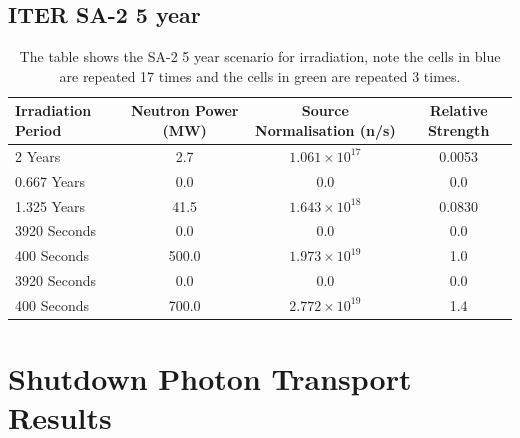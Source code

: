 \documentclass[12pt]{article}
\begin{document}
\subsection{ITER SA-2 5 year}
\begin{table}[ht!]
   \begin{tabular}{| l | c | c | c |}
      \hline 
      Irradiation Period & Neutron Power (MW) & Source Normalisation (n/s) &  Relative Strength \\
      \hline
      2 Years & 2.7 & $1.061\times10^{17}$ & 0.0053 \\
      0.667 Years & 0.0 & 0.0 & 0.0 \\
      1.325 Years & 41.5 & $1.643\times10^{18}$ & 0.0830 \\
      \cellcolor{blue!25} 3920 Seconds & \cellcolor{blue!25} 0.0 & \cellcolor{blue!25} 0.0 & \cellcolor{blue!25} 0.0 \\
      \cellcolor{blue!25} \cellcolor{blue!25} 400 Seconds & \cellcolor{blue!25} 500.0 & \cellcolor{blue!25} $1.973\times10^{19}$ & \cellcolor{blue!25} 1.0  \\
      \cellcolor{green!25} 3920 Seconds & \cellcolor{green!25} 0.0 & \cellcolor{green!25} 0.0 &\cellcolor{green!25} 0.0 \\
      \cellcolor{green!25} 400 Seconds & \cellcolor{green!25} 700.0 & \cellcolor{green!25} $2.772\times10^{19}$ &\cellcolor{green!25} 1.4 \\
      \hline
\end{tabular}
\caption{The table shows the SA-2 5 year scenario for irradiation, note the
         cells in \textcolor{blue!25}{blue} are repeated 17 times
         and the cells in \textcolor{green!25}{green} are repeated 3
         times.}
\end{table}

\newpage
\section{Shutdown Photon Transport Results}
\end{document}
